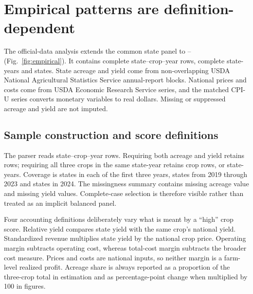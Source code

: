 \section{Empirical patterns are definition-dependent}

The official-data analysis extends the common state panel to \EmpiricalStartYear--\EmpiricalEndYear{} (Fig.~\ref{fig:empirical}). It contains \NCropRows{} complete state--crop--year rows, \NStateYears{} complete state-years and \NStates{} states. State acreage and yield come from non-overlapping USDA National Agricultural Statistics Service annual-report blocks. National prices and costs come from USDA Economic Research Service series, and the matched CPI-U series converts monetary variables to real dollars. Missing or suppressed acreage and yield are not imputed.

\subsection{Sample construction and score definitions}

The parser reads \ParsedCropRows{} state--crop--year rows. Requiring both acreage and yield retains \NonmissingCropRows{} rows; requiring all three crops in the same state-year retains \NCropRows{} crop rows, or \NStateYears{} state-years. Coverage is \EarlyCoverageStates{} states in each of the first three years, \MiddleCoverageStates{} states from 2019 through 2023 and \FinalCoverageStates{} states in 2024. The missingness summary contains \MissingAcreageRows{} missing acreage value and \MissingYieldRows{} missing yield values. Complete-case selection is therefore visible rather than treated as an implicit balanced panel.

Four accounting definitions deliberately vary what is meant by a ``high'' crop score. Relative yield compares state yield with the same crop's national yield. Standardized revenue multiplies state yield by the national crop price. Operating margin subtracts operating cost, whereas total-cost margin subtracts the broader cost measure. Prices and costs are national inputs, so neither margin is a farm-level realized profit. Acreage share is always reported as a proportion of the three-crop total in estimation and as percentage-point change when multiplied by 100 in figures.

